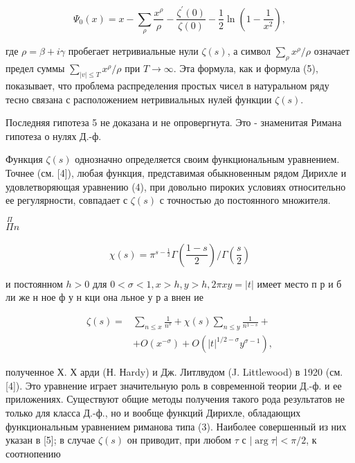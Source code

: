 \documentclass[10pt]{article}
\begin{document}
\[

\Psi_{0}(x)=x-\sum_{\rho} \frac{x^{\rho}}{\rho}-\frac{\zeta^{\prime}(0)}{\zeta(0)}-\frac{1}{2} \ln \left(1-\frac{1}{x^{2}}\right),

\]



где $\rho=\beta+i \gamma$ пробегает нетривиальные нули $\zeta(s)$, а символ $\sum_{\rho} x^{\rho} / \rho$ означает предел суммы $\sum_{|v| \leqslant T} x^{\rho} / \rho$ при $T \rightarrow \infty$. Эта формула, как и формула (5), показывает, что проблема распределения простых чисел в натуральном ряду тесно связана с расположением нетривиальных нулей функции $\zeta(s)$.



Последняя гипотеза 5 не доказана и не опровергнута. Это - знаменитая Римана гипотеза о нулях Д.-ф.



Функция $\zeta(s)$ однозначно определяется своим функциональным уравнением. Точнее (см. [4]), любая функция, представимая обыкновенным рядом Дирихле и удовлетворяющая уравнению (4), при довольно пироких условиях относительно ее регулярности, совпадает с $\zeta(s)$ с точностью до постоянного множителя.



$\stackrel{\Pi}{\Pi} n$



\[

\chi(s)=\pi^{s-\frac{1}{2}} \Gamma\left(\frac{1-s}{2}\right) / \Gamma\left(\frac{s}{2}\right)

\]



и постоянном $h>0$ для $0<\sigma<1, x>h, y>h, 2 \pi x y=|t|$ имеет место п р и б ли же н ное ф у н кци она льное у р а внен ие



\[

\begin{aligned}

\zeta(s)= & \sum_{n \leqslant x} \frac{1}{n^{s}}+\chi(s) \sum_{n \leqslant y} \frac{1}{n^{1-s}}+ \\

& +O\left(x^{-\sigma}\right)+O\left(|t|^{1 / 2-\sigma} y^{\sigma-1}\right),

\end{aligned}

\]



полученное Х. Х арди (Н. Нardy) и Дж. Литлвудом (J. Littlewood) в 1920 (см. [4]). Это уравнение играет значительную роль в современной теории Д.-ф. и ее приложениях. Существуют общие методы получения такого рода результатов не только для класса Д.-ф., но и вообще функций Дирихле, обладающих функциональным уравнением риманова типа (3). Наиболее совершенный из них указан в [5]; в случае $\zeta(s)$ он приводит, при любом $\tau$ с $|\arg \tau|<\pi / 2$, к соотнопению
\end{document}
